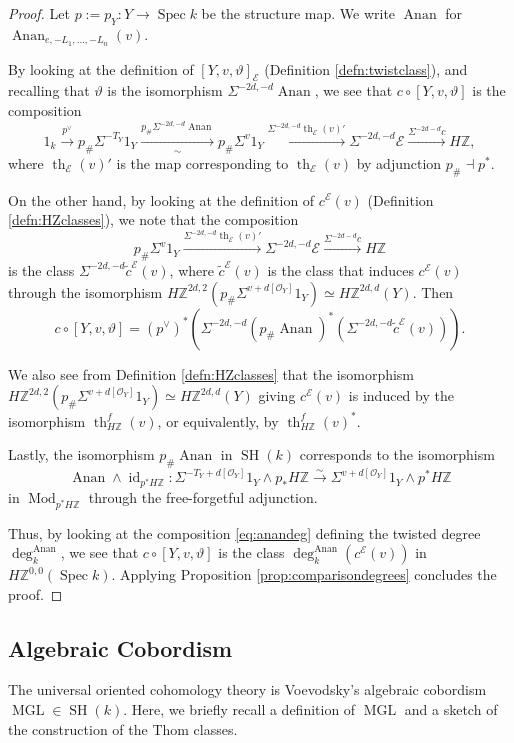 \documentclass[10pt]{amsart}
\theoremstyle{definition}
\theoremstyle{plain}
\numberwithin{equation}{section}
\newcommand{\0}{\emptyset}
\newcommand{\sE}{{\mathcal E}}
\newcommand{\sO}{{\mathcal O}}
\newcommand{\Z}{{\mathbb Z}}
\newcommand{\MGL}{{\operatorname{MGL}}}
\newcommand{\Spec}{{\operatorname{Spec}}}
\newcommand{\SH}{{\operatorname{SH}}}
\renewcommand{\th}{{\operatorname{th}}}
\renewcommand{\deg}{{\operatorname{deg}}}
\newcommand{\Mod}{{\operatorname{Mod}}}
\newcommand{\id}{{\operatorname{id}}}
\newcommand{\Anan}{{\operatorname{Anan}}}
\begin{document}
\begin{proof}
    Let $p:=p_Y:Y \to \Spec k$ be the structure map. We write $\Anan$ for $\Anan_{e, -L_1,\ldots, -L_n}(v)$.
    
    By looking at the definition of $[Y,v,\vartheta]_\sE$ (Definition \ref{defn:twistclass}), and recalling that $\vartheta$ is the isomorphism $\Sigma^{-2d,-d}\Anan$, we see that $c\circ [Y,v,\vartheta]$ is the composition
    $$1_k\xrightarrow{p^\vee}p_{\#}\Sigma^{-T_Y}1_Y\xrightarrow[\sim]{p_\#\Sigma^{-2d,-d}\Anan} p_{\#}\Sigma^{v}1_Y\xrightarrow{\Sigma^{-2d,-d}\th_\sE(v)'} \Sigma^{-2d,-d}\sE\xrightarrow{\Sigma^{-2d-d}c}H\Z,$$
where $\th_\sE(v)'$ is the map corresponding to $\th_\sE(v)$ by adjunction $p_\# \dashv p^*$.

On the other hand, by looking at the definition of $c^\sE(v)$ (Definition \ref{defn:HZclasses}), we note that the composition $$p_{\#}\Sigma^{v}1_Y\xrightarrow{\Sigma^{-2d,-d}\th_\sE(v)'} \Sigma^{-2d,-d}\sE\xrightarrow{\Sigma^{-2d-d}c}H\Z$$
is the class $\Sigma^{-2d,-d}\tilde{c}^\sE(v)$, where $\tilde{c}^\sE(v)$ is the class that induces $c^\sE(v)$ through the isomorphism $H\Z^{2d,2}(p_\#\Sigma^{v+d[\sO_Y]}1_Y)\simeq H\Z^{2d,d}(Y)$. Then
$$c\circ [Y,v,\vartheta]=(p^\vee)^*(\Sigma^{-2d,-d}(p_\#\Anan)^*(\Sigma^{-2d,-d}\tilde{c}^\sE(v))).$$

We also see from Definition \ref{defn:HZclasses} that the isomorphism $H\Z^{2d,2}(p_\#\Sigma^{v+d[\sO_Y]}1_Y)\simeq H\Z^{2d,d}(Y)$ giving $c^\sE(v)$ is induced by the isomorphism $\th_{H\Z}^f(v)$, or equivalently, by $\th_{H\Z}^f(v)^*$.

Lastly, the isomorphism $p_\#\Anan$ in $\SH(k)$ corresponds to the isomorphism 
$$\Anan \wedge \id_{p^*H\Z}:\Sigma^{-T_Y+d[\sO_Y]}1_Y \wedge p_*H\Z \xrightarrow{\sim} \Sigma^{v +d[\sO_Y]}1_Y \wedge p^*H\Z$$
in $\Mod_{p^*H\Z}$ through the free-forgetful adjunction. 

Thus, by looking at the composition \eqref{eq:anandeg} defining the twisted degree $\deg_k^\Anan$, we see that $c\circ [Y,v,\vartheta]$ is the class $\deg_k^\Anan(c^\sE(v))$ in $H\Z^{0,0}(\Spec k)$. Applying Proposition \ref{prop:comparisondegrees} concludes the proof. 
\end{proof}

\subsection{Algebraic Cobordism}
\label{section:MGL}

The universal oriented cohomology theory is Voevodsky's algebraic cobordism $\MGL\in \SH(k)$. Here, we briefly recall a definition of $\MGL$ and a sketch of the construction of the Thom classes.
\end{document}
